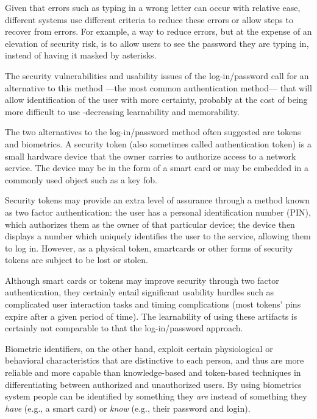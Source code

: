 \documentclass{article}
\begin{document}
Given that errors such as typing in a wrong letter can occur with relative ease, different systems use different criteria to reduce these errors or allow steps to recover from errors. For example, a way to reduce errors, but at the expense of an elevation of security risk, is to allow users to see the password they are typing in, instead of having it masked by asterisks.

The security vulnerabilities and usability issues of the log-in/password call for an alternative to this method ---the most common authentication method--- that will allow identification of the user with more certainty, probably at the cost of being more difficult to use -decreasing learnability and memorability.

The two alternatives to the log-in/password method often suggested are tokens and biometrics. A security token (also sometimes called authentication token) is a small hardware device that the owner carries to authorize access to a network service. The device may be in the form of a smart card or may be embedded in a commonly used object such as a key fob. 

Security tokens may provide an extra level of assurance through a method known as two factor authentication: the user has a personal identification number (PIN), which authorizes them as the owner of that particular device; the device then displays a number which uniquely identifies the user to the service, allowing them to log in. However, as a physical token, smartcards or other forms of security tokens are subject to be lost or stolen. 

Although smart cards or tokens may improve security through two factor authentication, they certainly entail significant usability hurdles such as complicated user interaction tasks and timing complications (most tokens’ pins expire after a given period of time). The learnability of using these artifacts is certainly not comparable to that the log-in/password approach.  

Biometric identifiers, on the other hand, exploit certain physiological or behavioral characteristics that are distinctive to each person, and thus are more reliable and more capable than knowledge-based and token-based techniques in differentiating between authorized and unauthorized users. By using biometrics system people can be identified by something they \textit{are} instead of something they \textit{have} (e.g., a smart card) or \textit{know} (e.g., their password and login). 
\end{document}
